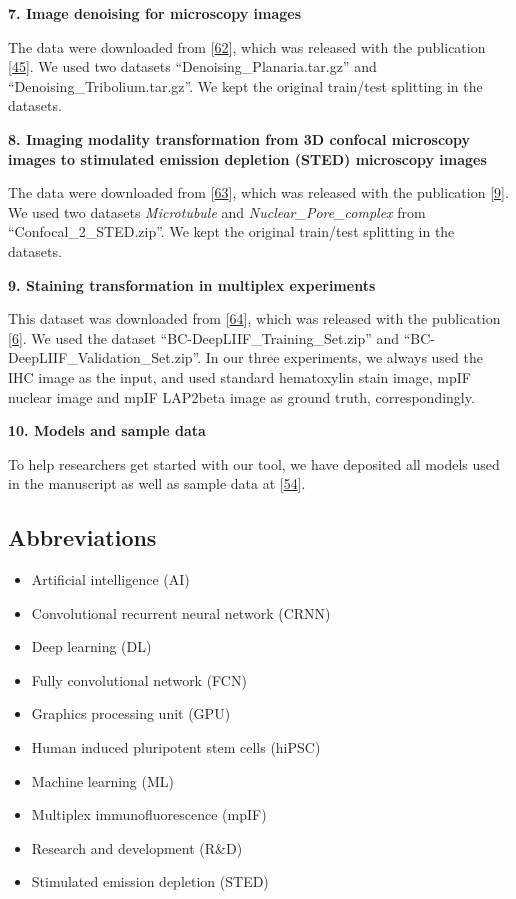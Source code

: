 \textbf{7. Image denoising for microscopy images}

The data were downloaded from {[}\protect\hyperlink{ref-b6GmFJlO}{62}{]}, which was released with the publication {[}\protect\hyperlink{ref-12G712Zky}{45}{]}. We used two datasets ``Denoising\_Planaria.tar.gz'' and ``Denoising\_Tribolium.tar.gz''. We kept the original train/test splitting in the datasets.

\textbf{8. Imaging modality transformation from 3D confocal microscopy images to stimulated emission depletion (STED) microscopy images}

The data were downloaded from {[}\protect\hyperlink{ref-ExHf2uD2}{63}{]}, which was released with the publication {[}\protect\hyperlink{ref-UEBDZ3tI}{9}{]}. We used two datasets \emph{Microtubule} and \emph{Nuclear\_Pore\_complex} from ``Confocal\_2\_STED.zip''. We kept the original train/test splitting in the datasets.

\textbf{9. Staining transformation in multiplex experiments}

This dataset was downloaded from {[}\protect\hyperlink{ref-cjAzGPun}{64}{]}, which was released with the publication {[}\protect\hyperlink{ref-WwenuBHa}{6}{]}. We used the dataset ``BC-DeepLIIF\_Training\_Set.zip'' and ``BC-DeepLIIF\_Validation\_Set.zip''. In our three experiments, we always used the IHC image as the input, and used standard hematoxylin stain image, mpIF nuclear image and mpIF LAP2beta image as ground truth, correspondingly.

\textbf{10. Models and sample data}

To help researchers get started with our tool, we have deposited all models used in the manuscript as well as sample data at {[}\protect\hyperlink{ref-FBoj3fXM}{54}{]}.

\hypertarget{abbreviations}{%
\subsection{Abbreviations}\label{abbreviations}}

\begin{itemize}
\tightlist
\item
  Artificial intelligence (AI)
\item
  Convolutional recurrent neural network (CRNN)
\item
  Deep learning (DL)
\item
  Fully convolutional network (FCN)
\item
  Graphics processing unit (GPU)
\item
  Human induced pluripotent stem cells (hiPSC)
\item
  Machine learning (ML)
\item
  Multiplex immunofluorescence (mpIF)
\item
  Research and development (R\&D)
\item
  Stimulated emission depletion (STED)
\end{itemize}

